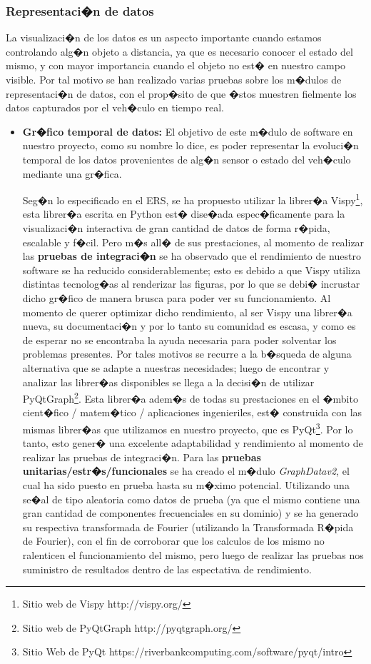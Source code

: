 \subsubsection{Representaci�n de datos} 

La visualizaci�n de los datos es un aspecto importante cuando estamos controlando alg�n objeto a distancia, ya que es necesario conocer el estado del mismo, y con mayor importancia cuando el objeto no est� en nuestro campo visible. Por tal motivo se han realizado varias pruebas sobre los m�dulos de representaci�n de datos, con el prop�sito de que �stos muestren fielmente los datos capturados por el veh�culo en tiempo real.
\begin{itemize}
	\item \textbf{Gr�fico temporal de datos: }	El objetivo de este m�dulo de software en nuestro proyecto, como su nombre lo dice, es poder representar la evoluci�n temporal de los datos provenientes de alg�n sensor o estado del veh�culo mediante una gr�fica. 
	\par Seg�n lo especificado en el ERS, se ha propuesto utilizar la librer�a Vispy\footnote{Sitio web de Vispy http://vispy.org/}, esta librer�a escrita en Python  est� dise�ada espec�ficamente para la visualizaci�n interactiva de gran cantidad de datos de forma r�pida, escalable y f�cil.  Pero m�s all� de sus prestaciones, al momento de realizar las \textbf{pruebas de integraci�n} se ha observado que el rendimiento de nuestro software se ha reducido considerablemente; esto es debido a que Vispy utiliza distintas tecnolog�as al renderizar las figuras, por lo que se debi� incrustar dicho gr�fico de manera brusca para poder ver su funcionamiento. Al momento de querer optimizar dicho rendimiento, al ser Vispy una librer�a nueva,  su documentaci�n y por lo tanto su comunidad es escasa, y como es de esperar no se encontraba la ayuda necesaria para poder solventar los problemas presentes. Por tales motivos se recurre a la b�squeda de alguna alternativa que se adapte a nuestras necesidades; luego de encontrar y analizar las librer�as disponibles se llega a la decisi�n de utilizar PyQtGraph\footnote{Sitio web de PyQtGraph http://pyqtgraph.org/}. Esta librer�a adem�s de todas su prestaciones en el �mbito cient�fico / matem�tico / aplicaciones ingenieriles, est� construida con las mismas librer�as que utilizamos en nuestro proyecto, que es PyQt\footnote{Sitio Web de PyQt https://riverbankcomputing.com/software/pyqt/intro}. Por lo tanto, esto gener� una excelente adaptabilidad y rendimiento al momento de realizar las pruebas de integraci�n.  
	Para las \textbf{pruebas unitarias/estr�s/funcionales} se ha creado el m�dulo \textit{GraphDatav2}, el cual ha sido puesto en prueba hasta su m�ximo potencial. Utilizando una se�al de tipo aleatoria como datos de prueba (ya que el mismo contiene una gran cantidad de componentes frecuenciales en su dominio) y se ha generado su respectiva transformada de Fourier (utilizando la Transformada R�pida de Fourier), con el fin de corroborar que los calculos de los mismo no ralenticen el funcionamiento del mismo, pero luego de realizar las pruebas nos suministro de  resultados  dentro de las espectativa de rendimiento. 
	

\end{itemize}
